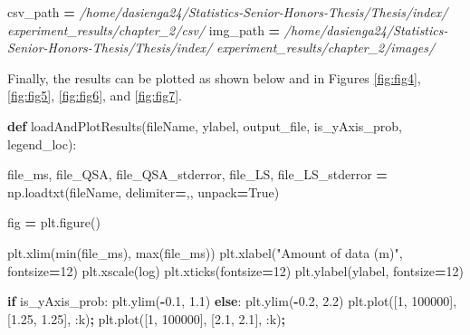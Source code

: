 \documentclass[12pt, twoside]{amherstthesis}
\newenvironment{Shaded}{\begin{snugshade}}{\end{snugshade}}
\newcommand{\BuiltInTok}[1]{#1}
\newcommand{\CommentTok}[1]{\textcolor[rgb]{0.56,0.35,0.01}{\textit{#1}}}
\newcommand{\ControlFlowTok}[1]{\textcolor[rgb]{0.13,0.29,0.53}{\textbf{#1}}}
\newcommand{\DecValTok}[1]{\textcolor[rgb]{0.00,0.00,0.81}{#1}}
\newcommand{\FloatTok}[1]{\textcolor[rgb]{0.00,0.00,0.81}{#1}}
\newcommand{\KeywordTok}[1]{\textcolor[rgb]{0.13,0.29,0.53}{\textbf{#1}}}
\newcommand{\NormalTok}[1]{#1}
\newcommand{\OperatorTok}[1]{\textcolor[rgb]{0.81,0.36,0.00}{\textbf{#1}}}
\newcommand{\StringTok}[1]{\textcolor[rgb]{0.31,0.60,0.02}{#1}}
\newcommand{\VariableTok}[1]{\textcolor[rgb]{0.00,0.00,0.00}{#1}}
\begin{document}
\begin{Shaded}
\begin{Highlighting}[]
\NormalTok{csv\_path }\OperatorTok{=} 
\CommentTok{\textquotesingle{}/home/dasienga24/Statistics{-}Senior{-}Honors{-}Thesis/Thesis/index/\textquotesingle{}}
\CommentTok{\textquotesingle{}experiment\_results/chapter\_2/csv/\textquotesingle{}}
\NormalTok{img\_path }\OperatorTok{=} 
\CommentTok{\textquotesingle{}/home/dasienga24/Statistics{-}Senior{-}Honors{-}Thesis/Thesis/index/\textquotesingle{}}
\CommentTok{\textquotesingle{}experiment\_results/chapter\_2/images/\textquotesingle{}}
\end{Highlighting}
\end{Shaded}
\noindent Finally, the results can be plotted as shown below and in Figures \ref{fig:fig4}, \ref{fig:fig5}, \ref{fig:fig6}, and \ref{fig:fig7}.
\begin{Shaded}
\begin{Highlighting}[]
\KeywordTok{def}\NormalTok{ loadAndPlotResults(fileName, ylabel, output\_file, is\_yAxis\_prob, }
\NormalTok{legend\_loc):}
  
\NormalTok{    file\_ms, file\_QSA, file\_QSA\_stderror, file\_LS, }
\NormalTok{    file\_LS\_stderror }\OperatorTok{=}\NormalTok{ np.loadtxt(fileName, delimiter}\OperatorTok{=}\StringTok{\textquotesingle{},\textquotesingle{}}\NormalTok{, unpack}\OperatorTok{=}\VariableTok{True}\NormalTok{)}

\NormalTok{    fig }\OperatorTok{=}\NormalTok{ plt.figure()}

\NormalTok{    plt.xlim(}\BuiltInTok{min}\NormalTok{(file\_ms), }\BuiltInTok{max}\NormalTok{(file\_ms))}
\NormalTok{    plt.xlabel(}\StringTok{"Amount of data (m)"}\NormalTok{, fontsize}\OperatorTok{=}\DecValTok{12}\NormalTok{)}
\NormalTok{    plt.xscale(}\StringTok{\textquotesingle{}log\textquotesingle{}}\NormalTok{)}
\NormalTok{    plt.xticks(fontsize}\OperatorTok{=}\DecValTok{12}\NormalTok{)}
\NormalTok{    plt.ylabel(ylabel, fontsize}\OperatorTok{=}\DecValTok{12}\NormalTok{)}

    \ControlFlowTok{if}\NormalTok{ is\_yAxis\_prob:}
\NormalTok{        plt.ylim(}\OperatorTok{{-}}\FloatTok{0.1}\NormalTok{, }\FloatTok{1.1}\NormalTok{)}
    \ControlFlowTok{else}\NormalTok{:}
\NormalTok{        plt.ylim(}\OperatorTok{{-}}\FloatTok{0.2}\NormalTok{, }\FloatTok{2.2}\NormalTok{)}
\NormalTok{        plt.plot([}\DecValTok{1}\NormalTok{, }\DecValTok{100000}\NormalTok{], [}\FloatTok{1.25}\NormalTok{, }\FloatTok{1.25}\NormalTok{], }\StringTok{\textquotesingle{}:k\textquotesingle{}}\NormalTok{)}\OperatorTok{;}
\NormalTok{        plt.plot([}\DecValTok{1}\NormalTok{, }\DecValTok{100000}\NormalTok{], [}\FloatTok{2.1}\NormalTok{,  }\FloatTok{2.1}\NormalTok{],  }\StringTok{\textquotesingle{}:k\textquotesingle{}}\NormalTok{)}\OperatorTok{;}      


\end{Highlighting}
\end{Shaded}
\end{document}
